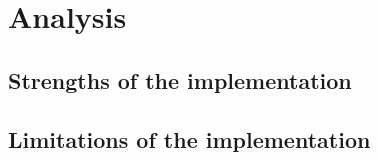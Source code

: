 \section*{Analysis}

\subsection*{Strengths of the implementation}

\subsection*{Limitations of the implementation}

